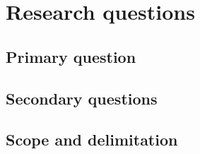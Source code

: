 
\section{Research questions}
\label{sec:questions}


\subsection{Primary question}
\label{sec:rq-primary}


\subsection{Secondary questions}
\label{sec:rq-secondary}


\subsection{Scope and delimitation}
\label{sec:scope}

